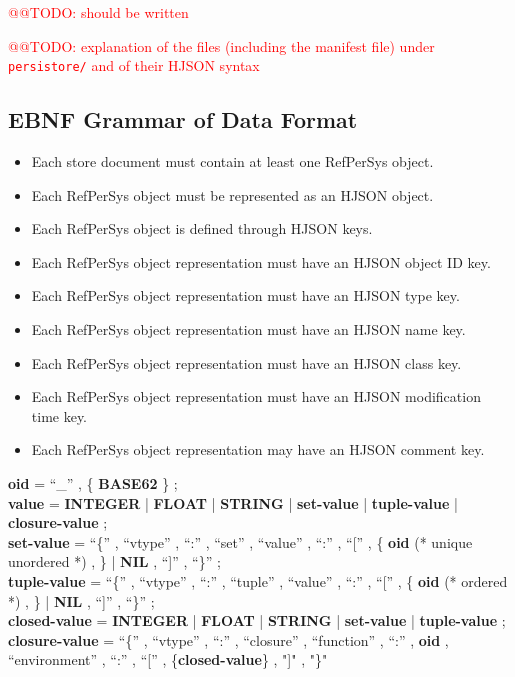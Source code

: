 \documentclass[11pt,a4paper,svgnames]{article}
\begin{document}
\textcolor{red}{@@TODO: should be written}

\textcolor{red}{@@TODO: explanation of the files (including the
  manifest file) under \texttt{persistore/} and of their HJSON syntax}


\subsection{EBNF Grammar of Data Format}
\label{subsec:data-format-ebnf}

\begin{itemize}
  \item Each store document must contain at least one RefPerSys object.
  \item Each RefPerSys object must be represented as an HJSON object.
  \item Each RefPerSys object is defined through HJSON keys.
  \item Each RefPerSys object representation must have an HJSON object ID key.
  \item Each RefPerSys object representation must have an HJSON type key.
  \item Each RefPerSys object representation must have an HJSON  name key.
  \item Each RefPerSys object representation must have an HJSON class key.
  \item Each RefPerSys object representation must have an HJSON modification time key.
  \item Each RefPerSys object representation may have an HJSON comment key.
\end{itemize}

\textbf{oid} = ``\_'' , \{ \textbf{BASE62} \} ; \\
\textbf{value} = \textbf{INTEGER} | \textbf{FLOAT} | \textbf{STRING} 
	       | \textbf{set-value} | \textbf{tuple-value}  | \textbf{closure-value} ; \\
\textbf{set-value} = ``\{'' , ``vtype'' , ``:'' , ``set'' , 
                   ``value'' , ``:'' , 
		   ``['' , \{ \textbf{oid} (* unique unordered *) , \} 
		   | \textbf{NIL} , ``]'' ,  ``\}'' ; \\
\textbf{tuple-value} = ``\{'' , ``vtype'' , ``:'' , ``tuple'' , 
                   ``value'' , ``:'' , 
		   ``['' , \{ \textbf{oid} (* ordered *) , \} 
		   | \textbf{NIL} , ``]'' ,  ``\}'' ; \\
\textbf{closed-value} = \textbf{INTEGER} | \textbf{FLOAT} | \textbf{STRING}
                      | \textbf{set-value} | \textbf{tuple-value} ; \\
\textbf{closure-value} = ``\{'' , ``vtype'' , ``:'' , ``closure'' , 
		       ``function'' , ``:'' , \textbf{oid} , 
		       ``environment'' , ``:'' , ``['' , \{\textbf{closed-value}\} , "]" , "\}"

\clearpage
\printnoidxglossaries
\bigskip
\printbibliography
\bigskip
\printindex
\end{document}
